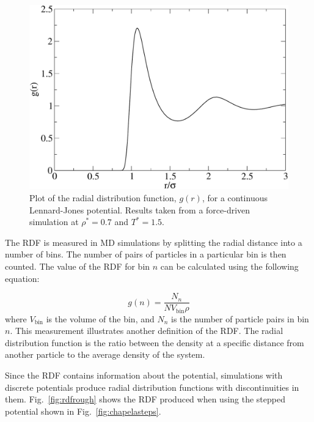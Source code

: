 \documentclass[12pt]{UoAthesis} \usepackage{booktabs}
\begin{document}
\begin{figure}[htp] 
  \begin{center}
    \includegraphics[clip,scale=0.45]{figures/rdfsmooth} 
    \caption[Plot of the radial distribution function for the
    Lennard-Jones density]
    {\label{fig:rdfsmooth} Plot of the radial distribution function,
      $g(r)$, for a continuous Lennard-Jones potential. Results taken
      from a force-driven simulation at $\rho^*=0.7$ and $T^*=1.5$.}
  \end{center}
\end{figure}
The RDF is measured in MD simulations by splitting the radial distance
into a number of bins.  The number of pairs of particles in a
particular bin is then counted.  The value of the RDF for bin $n$ can
be calculated using the following equation:

\begin{equation}
  \label{eq:rdf}
  g(n) = \frac{N_n}{NV_{\text{bin}}\rho}
\end{equation}
where $V_{\text{bin}}$ is the volume of the bin, and $N_n$ is the
number of particle pairs in bin $n$.  This measurement illustrates
another definition of the RDF.  The radial distribution function is
the ratio between the density at a specific distance from another
particle to the average density of the system.

Since the RDF contains information about the potential, simulations
with discrete potentials produce radial distribution functions with
discontinuities in them. Fig.~\ref{fig:rdfrough} shows the RDF
produced when using the stepped potential shown in
Fig.~\ref{fig:chapelasteps}.
\end{document}
